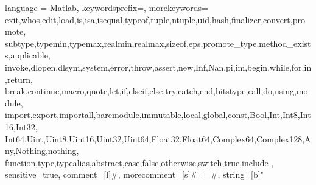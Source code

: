 
%
{ language = Matlab,%
    keywordsprefix=\@,%
    morekeywords={
    exit,whos,edit,load,is,isa,isequal,typeof,tuple,ntuple,uid,hash,finalizer,convert,promote,
    subtype,typemin,typemax,realmin,realmax,sizeof,eps,promote_type,method_exists,applicable,
    invoke,dlopen,dlsym,system,error,throw,assert,new,Inf,Nan,pi,im,begin,while,for,in,return,
    break,continue,macro,quote,let,if,elseif,else,try,catch,end,bitstype,call,do,using,module,
    import,export,importall,baremodule,immutable,local,global,const,Bool,Int,Int8,Int16,Int32,
    Int64,Uint,Uint8,Uint16,Uint32,Uint64,Float32,Float64,Complex64,Complex128,Any,Nothing,nothing,
    function,type,typealias,abstract,case,false,otherwise,switch,true,include
  },%
  sensitive=true, %
  comment=[l]{\#}, %
  morecomment=[s]{\#=}{=\#}, %
  string=[b]" %
}

